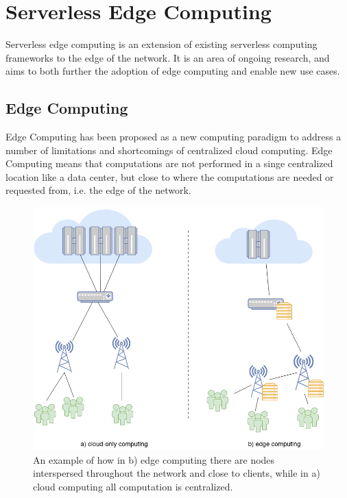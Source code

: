 \section{Serverless Edge Computing}

Serverless edge computing is an extension of existing serverless computing frameworks to the edge of the network.
It is an area of ongoing research, and aims to both further the adoption of edge computing and enable new use cases\cite{nasticServerlessRealTimeData2017}.

\subsection{Edge Computing}
Edge Computing has been proposed as a new computing paradigm to address a number of limitations and shortcomings of centralized cloud computing.
Edge Computing means that computations are not performed in a singe centralized location like a data center, but close to where the computations are needed or requested from, i.e. the edge of the network\cite{shiPromiseEdgeComputing2016}.

\begin{figure}
    \centering
    \includegraphics[width=12cm]{graphics/diagrams/edge_computing_example.png}
    \caption{An example of how in b) edge computing there are nodes interspersed throughout the network and close to clients, while in a) cloud computing all computation is centralized.}
    \label{fig:edge_comp_example}
\end{figure}

